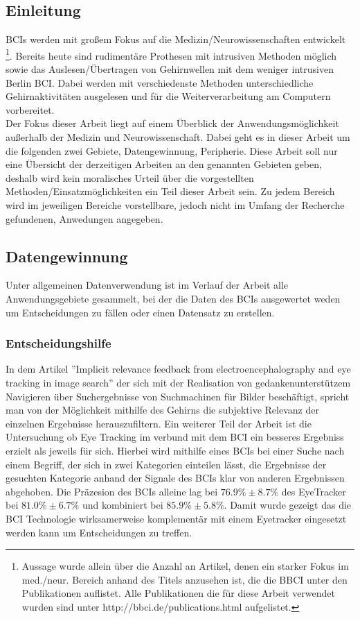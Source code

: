 \documentclass[11pt,ngerman,parskip=half]{scrartcl}
\begin{document}
\subsection{Einleitung}
BCIs werden mit großem Fokus auf die Medizin/Neurowissenschaften entwickelt
\footnote{Aussage wurde allein über die Anzahl an Artikel, denen ein starker Fokus im med./neur. Bereich anhand 
des Titels anzusehen ist, die die BBCI unter den Publikationen auflistet. Alle Publikationen die für diese Arbeit 
verwendet wurden sind unter http://bbci.de/publications.html aufgelistet.}. Bereits heute sind rudimentäre Prothesen
mit intrusiven Methoden möglich sowie das Auslesen/Übertragen von Gehirnwellen mit dem weniger intrusiven Berlin BCI.
Dabei werden mit verschiedenste Methoden unterschiedliche Gehirnaktivitäten ausgelesen und für die 
Weiterverarbeitung am Computern vorbereitet.\\ Der Fokus dieser Arbeit liegt auf einem Überblick der Anwendungsmöglichkeit
außerhalb der Medizin und Neurowissenschaft. Dabei geht es in dieser Arbeit um die folgenden zwei Gebiete,
Datengewinnung, Peripherie. Diese Arbeit soll nur eine Übersicht der derzeitigen Arbeiten an den genannten
Gebieten geben, deshalb wird kein moralisches Urteil über die vorgestellten Methoden/Einsatzmöglichkeiten
ein Teil dieser Arbeit sein. Zu jedem Bereich wird im jeweiligen Bereiche vorstellbare,
jedoch nicht im Umfang der Recherche gefundenen, Anwedungen angegeben. 
\subsection{Datengewinnung}
Unter allgemeinen Datenverwendung ist im Verlauf der Arbeit alle Anwendungsgebiete gesammelt,
 bei der die Daten des BCIs ausgewertet weden um Entscheidungen zu fällen oder einen Datensatz zu erstellen.  
\subsubsection{Entscheidungshilfe}
In dem Artikel ''Implicit relevance feedback from electroencephalography and eye tracking in image search''\parencite{tracking} 
der sich mit der Realisation von gedankenunterstützem Navigieren über Suchergebnisse von Suchmachinen
für Bilder beschäftigt, spricht man von der Möglichkeit mithilfe des Gehirns die subjektive Relevanz der einzelnen Ergebnisse 
herauszufiltern. Ein weiterer Teil der Arbeit ist die Untersuchung ob Eye Tracking im verbund mit dem BCI ein besseres Ergebniss erzielt als jeweils für sich.
Hierbei wird mithilfe eines BCIs bei einer Suche nach einem Begriff, der sich in zwei Kategorien einteilen lässt, 
die Ergebnisse der gesuchten Kategorie anhand der Signale des BCIs klar von anderen Ergebnissen abgehoben. Die Präzesion des BCIs 
alleine lag bei  $76.9\% \pm 8.7\% $ des EyeTracker bei $81.0\% \pm 6.7\% $ und kombiniert bei $85.9\% \pm 5.8\% $\parencite[3.1.]{tracking}.
Damit wurde gezeigt das die BCI Technologie wirksamerweise komplementär mit einem Eyetracker eingesetzt werden kann um Entscheidungen zu treffen.   
\end{document}
